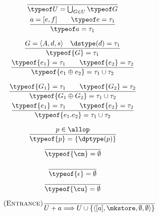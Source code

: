 \begin{figure*}
\begin{minipage}{\textwidth}
  \flushright{} \\
  \begin{minipage}{0.24\textwidth}
    \begin{gather*}
    \frac{}{\typeof U = \bigcup_{G\in U} \typeof G} \\
    \frac{
        {a=[e,f]}\qquad
        {\typeof e = \tau_1}}
      {\typeof a = \tau_1}
    \end{gather*}
  \end{minipage}
  \begin{minipage}{0.24\textwidth}
    \begin{gather*}
    \frac{
        {G = \langle A,d,s\rangle}\quad
        {\dstype(d) = \tau_1}}
    {\typeof{G} = \tau_1} \\
    \frac{
        {\typeof{e_1} = \tau_1}\qquad
        {\typeof{e_2} = \tau_2}}
    {\typeof{e_1\oplus e_2} = \tau_1\cup\tau_2}
    \end{gather*}
  \end{minipage}
  \begin{minipage}{0.24\textwidth}
    \begin{gather*}
    \frac{
        {\typeof{G_1} = \tau_1}\qquad
        {\typeof{G_2} = \tau_2}}
    {\typeof{G_1\oplus G_2} = \tau_1\cup\tau_2} \\
    \frac{
        {\typeof{e_1} = \tau_1}\qquad
        {\typeof{e_2} = \tau_2}}
    {\typeof{e_1.e_2} = \tau_1\cup\tau_2}
    \end{gather*}
  \end{minipage}
  \begin{minipage}{0.12\textwidth}
    \begin{gather*}
    \frac{p \in \allop}{\typeof{p} = \{\dptype(p)\}} \\
    \frac{\quad}{\typeof{\cm} = \emptyset}
    \end{gather*}
  \end{minipage}
  \begin{minipage}{0.12\textwidth}
    \begin{gather*}
    \frac{\quad}{\typeof{\epsilon} = \emptyset} \\
    \frac{\quad}{\typeof{\cu} = \emptyset}
    \end{gather*}
  \end{minipage}
  \flushright{}
  \[
    \tag{\sc Entrance}\label{rule:birth}
    \frac{}{U + a \Longrightarrow U\cup\{\langle [a],\mkstore,\emptyset,\emptyset\rangle\}}
\]
\end{minipage}
\end{figure*}
